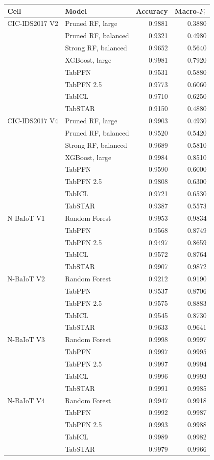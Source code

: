 \begin{tabular}{@{}llrr@{}}
\toprule
Cell & Model & Accuracy & Macro-$F_1$ \\
\midrule
CIC-IDS2017 V2 & Pruned RF, large & 0.9881 & 0.3880 \\
 & Pruned RF, balanced & 0.9321 & 0.4980 \\
 & Strong RF, balanced & 0.9652 & 0.5640 \\
 & XGBoost, large & 0.9981 & 0.7920 \\
 & TabPFN & 0.9531 & 0.5880 \\
 & TabPFN 2.5 & 0.9773 & 0.6060 \\
 & TabICL & 0.9710 & 0.6250 \\
 & TabSTAR & 0.9150 & 0.4880 \\
\addlinespace
CIC-IDS2017 V4 & Pruned RF, large & 0.9903 & 0.4930 \\
 & Pruned RF, balanced & 0.9520 & 0.5420 \\
 & Strong RF, balanced & 0.9689 & 0.5810 \\
 & XGBoost, large & 0.9984 & 0.8510 \\
 & TabPFN & 0.9590 & 0.6000 \\
 & TabPFN 2.5 & 0.9808 & 0.6300 \\
 & TabICL & 0.9721 & 0.6530 \\
 & TabSTAR & 0.9387 & 0.5573 \\
\addlinespace
N-BaIoT V1 & Random Forest & 0.9953 & 0.9834 \\
 & TabPFN & 0.9568 & 0.8749 \\
 & TabPFN 2.5 & 0.9497 & 0.8659 \\
 & TabICL & 0.9572 & 0.8764 \\
 & TabSTAR & 0.9907 & 0.9872 \\
\addlinespace
N-BaIoT V2 & Random Forest & 0.9212 & 0.9190 \\
 & TabPFN & 0.9537 & 0.8706 \\
 & TabPFN 2.5 & 0.9575 & 0.8883 \\
 & TabICL & 0.9545 & 0.8730 \\
 & TabSTAR & 0.9633 & 0.9641 \\
\addlinespace
N-BaIoT V3 & Random Forest & 0.9998 & 0.9997 \\
 & TabPFN & 0.9997 & 0.9995 \\
 & TabPFN 2.5 & 0.9997 & 0.9994 \\
 & TabICL & 0.9996 & 0.9993 \\
 & TabSTAR & 0.9991 & 0.9985 \\
\addlinespace
N-BaIoT V4 & Random Forest & 0.9947 & 0.9918 \\
 & TabPFN & 0.9992 & 0.9987 \\
 & TabPFN 2.5 & 0.9993 & 0.9988 \\
 & TabICL & 0.9989 & 0.9982 \\
 & TabSTAR & 0.9979 & 0.9966 \\
\bottomrule
\end{tabular}
